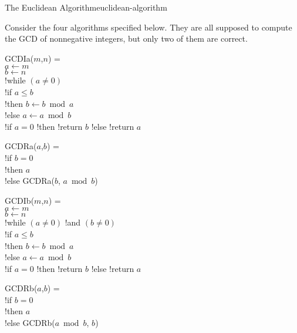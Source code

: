 \documentclass{tufte-handout}
\begin{document}
\begin{model*}{The Euclidean Algorithm}{euclidean-algorithm}

  Consider the four algorithms specified below. They are all supposed
  to compute the GCD of nonnegative integers, but only two of them are
  correct. \bigskip

\begin{minipage}[t]{.5\textwidth}
\begin{acode}
\> GCDIa($m$,$n$) = \\
\> \tb \> $a \gets m$ \\
\>     \> $b \gets n$ \\
\>     \> !while $(a \neq 0)$ \\
\>     \> \tb \> !if $a \leq b$ \\
\>     \>     \> \tb \> !then \> $b \gets b \bmod a$ \\
\>     \>     \>     \> !else \> $a \gets a \bmod b$ \\
\>     \> !if $a = 0$ !then !return $b$ !else !return $a$
\end{acode} \bigskip

\begin{acode}
\> GCDRa($a$,$b$) = \\
\> \tb \> !if $b = 0$ \\
\>     \> \tb \> !then \> $a$ \\
\>     \>     \> !else \> GCDRa($b$, $a \bmod b$)
\end{acode}
\end{minipage}
\begin{minipage}[t]{.5\textwidth}
\begin{acode}
\> GCDIb($m$,$n$) = \\
\> \tb \> $a \gets m$ \\
\>     \> $b \gets n$ \\
\>     \> !while $(a \neq 0)$ !and $(b \neq 0)$ \\
\>     \> \tb \> !if $a \leq b$ \\
\>     \>     \> \tb \> !then \> $b \gets b \bmod a$ \\
\>     \>     \>     \> !else \> $a \gets a \bmod b$ \\
\>     \> !if $a = 0$ !then !return $b$ !else !return $a$
\end{acode} \bigskip

\begin{acode}
\> GCDRb($a$,$b$) = \\
\> \tb \> !if $b = 0$ \\
\>     \> \tb \> !then \> $a$ \\
\>     \>     \> !else \> GCDRb($a \bmod b$, $b$)
\end{acode}
\end{minipage}
\end{model*}
\end{document}
